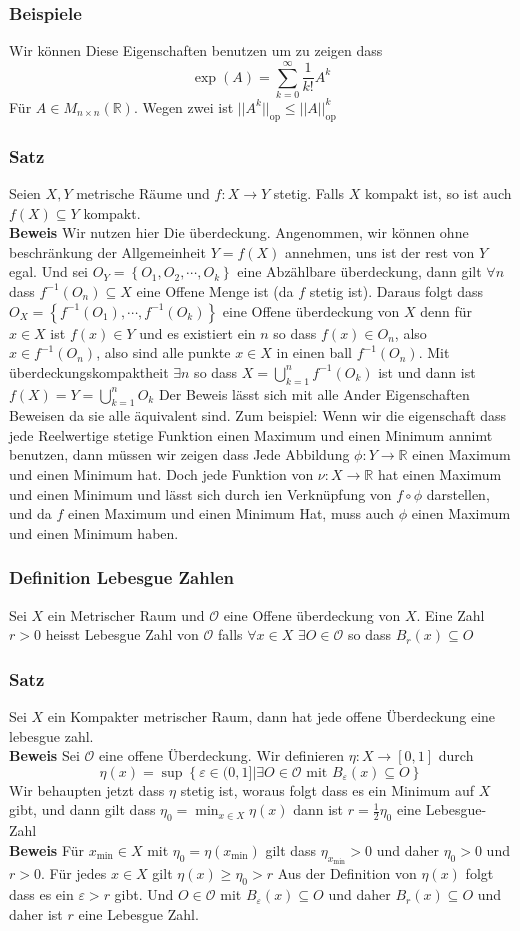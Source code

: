 \documentclass{article}
\newcommand{\satz}[1]{\subsubsection*{Satz {#1}}}
\newcommand{\beweis}{\\\textbf{Beweis }}
\newcommand{\beispiel}[1]{\subsubsection*{Beispiele {#1}}}
\newcommand{\definition}[1]{\subsubsection*{Definition {#1}}}
\begin{document}
\beispiel{} Wir können Diese Eigenschaften benutzen um zu zeigen dass \[\exp(A)=\sum_{k=0}^{\infty}\frac{1}{k!}A^k\] Für $A\in M_{n\times n} (\mathbb{R})$.
Wegen zwei ist $||A^k||_{\text{op}}\le ||A||_{\text{op}}^k$
\satz{} Seien $X,Y$ metrische Räume und $f:X \rightarrow Y$ stetig. Falls $X$ kompakt ist, so ist auch $f(X)\subseteq Y$ kompakt.
\beweis Wir nutzen hier Die überdeckung. Angenommen, wir können ohne beschränkung der Allgemeinheit $Y=f(X)$ annehmen, uns ist der rest von $Y$ egal. Und sei $O_Y=\left\lbrace O_1, O_2, \cdots, O_k\right\rbrace$ eine Abzählbare überdeckung,
dann gilt $\forall n$ dass $f^{-1}(O_n) \subseteq X$ eine Offene Menge ist (da $f$ stetig ist). Daraus folgt dass $O_X=\left\lbrace f^{-1}(O_1),\cdots, f^{-1}(O_k)\right\rbrace$ eine Offene überdeckung von $X$ denn für $x\in X$ ist $f(x)\in Y$ und es existiert ein $n$ so dass
$f(x)\in O_n$, also $x\in f^{-1}(O_n)$, also sind alle punkte $x\in X$ in einen ball $f^{-1}(O_n)$. Mit überdeckungskompaktheit $\exists n$ so dass $X=\bigcup_{k=1}^nf^{-1}(O_k)$ ist und dann ist $f(X)=Y=\bigcup_{k=1}^nO_k$
\newline Der Beweis lässt sich mit alle Ander Eigenschaften Beweisen da sie alle äquivalent sind. Zum beispiel:
\newline Wenn wir die eigenschaft dass jede Reelwertige stetige Funktion einen Maximum und einen Minimum annimt benutzen, dann müssen wir zeigen dass Jede Abbildung $\phi:Y \rightarrow \mathbb{R}$ einen Maximum und einen Minimum hat. Doch jede Funktion von $\nu: X \rightarrow \mathbb{R}$ hat einen Maximum und einen Minimum und lässt sich 
durch ien Verknüpfung von $f \circ \phi$ darstellen, und da $f$ einen Maximum und einen Minimum Hat, muss auch $\phi$ einen Maximum und einen Minimum haben.
\definition{Lebesgue Zahlen} Sei $X$ ein Metrischer Raum und $\mathcal{O}$ eine Offene überdeckung von $X$. Eine Zahl $r>0$ heisst Lebesgue Zahl von $\mathcal{O}$ falls $\forall x\in X$ $\exists O\in \mathcal{O}$ so dass $B_r(x)\subseteq O$
\satz{} Sei $X$ ein Kompakter metrischer Raum, dann hat jede offene Überdeckung eine lebesgue zahl.
\beweis Sei $\mathcal{O}$ eine offene Überdeckung. Wir definieren $\eta: X \rightarrow[0,1]$ durch \[\eta(x)=\sup \left\lbrace \varepsilon \in (0,1]|\exists O\in \mathcal{O} \text{ mit } B_{\varepsilon}(x)\subseteq O\right\rbrace\]
Wir behaupten jetzt dass $\eta$ stetig ist, woraus folgt dass es ein Minimum auf $X$ gibt, und dann gilt dass $\eta_0=\min_{x\in X}\eta(x)$ dann ist $r=\frac{1}{2}\eta_0$ eine Lebesgue-Zahl
\beweis Für $x_{\text{min}}\in X$ mit $\eta_0=\eta(x_{\text{min}})$ gilt dass $\eta_{x_\text{min}}>0$ und daher $\eta_0>0$ und $r>0$. Für jedes $x\in X$ gilt $\eta(x)\ge \eta_0 > r$ Aus der Definition von $\eta(x)$ folgt dass es ein $\varepsilon >r$ gibt. Und $O\in \mathcal{O}$ mit $B_{\varepsilon}(x)\subseteq O$ und daher $B_r(x) \subseteq O$ und daher ist $r$ eine Lebesgue Zahl.
\end{document}
